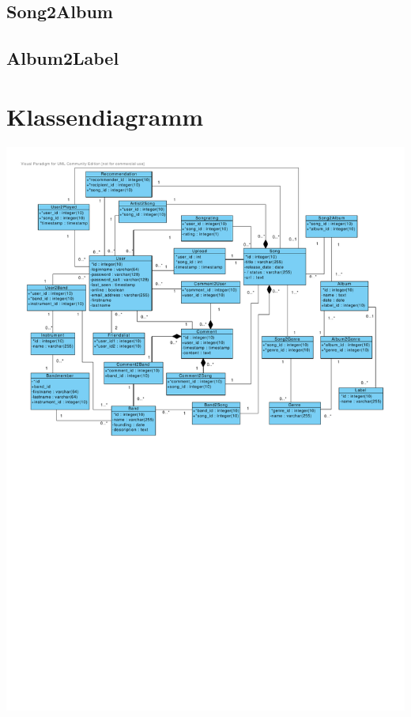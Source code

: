 \documentclass[11pt,a4paper,DIV=9]{scrartcl}
\begin{document}
  \subsection{Song2Album}
  \subsection{Album2Label}



\section{Klassendiagramm}
\includegraphics[page=1, angle=90,trim=0cm 0cm 1.1cm 1cm, clip=true, scale=1.1]{Diagram1}
\end{document}
